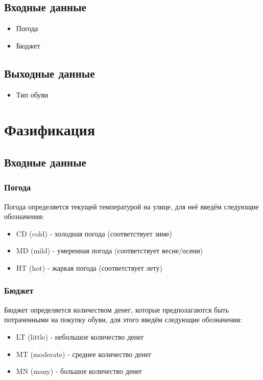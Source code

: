 \documentclass[12pt,a4paper]{report}
\begin{document}
\subsection*{Входные данные}
\begin{itemize}
    \item Погода
    \item Бюджет
\end{itemize}
\subsection*{Выходные данные}
\begin{itemize}
    \item Тип обуви
\end{itemize}
\newpage
\section*{Фазификация}
\subsection*{Входные данные}
\subsubsection*{Погода}
Погода определяется текущей температурой на улице, для неё введём следующие обозначения:
\begin{itemize}
    \item CD (cold) - холодная погода (соответствует зиме)
    \item MD (mild) - умеренная погода (соответствует весне/осени)
    \item HT (hot)  - жаркая погода (соответствует лету)
\end{itemize}
\subsubsection*{Бюджет}
Бюджет определяется количеством денег, которые предполагаются быть потраченными на покупку обуви, для этого введём следующие обозначения:
\begin{itemize}
    \item LT (little) - небольшое количество денег
    \item MT (moderate) - среднее количество денег
    \item MN (many)  - большое количество денег
\end{itemize}
\end{document}
